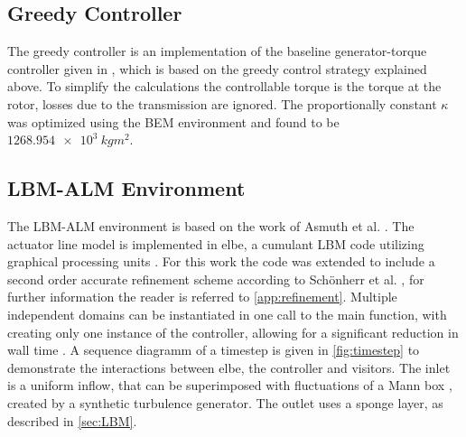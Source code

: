 \subsection{Greedy Controller}
The greedy controller is an implementation of the baseline generator-torque controller given in \cite{jonkman_definition_2009}, which is based on the greedy control strategy explained above. To simplify the calculations the controllable torque is the torque at the rotor, losses due to the transmission are ignored. The proportionally constant $\kappa$ was optimized using the BEM environment and found to be $\SI{1268.954e3}{kgm^2}$.
\subsection{LBM-ALM Environment}
The LBM-ALM environment is based on the work of Asmuth et al. \cite{asmuth_actuator_2020, asmuth_actuator_2019}. The actuator line model is implemented in elbe, a cumulant LBM code  utilizing graphical processing units \cite{jansen_validation_2015, gehrke_scrutinizing_2017}. For this work the code was extended to include a second order accurate refinement scheme according to Schönherr et al. \cite{schonherr_towards_2015}, for further information the reader is referred to \autoref{app:refinement}. Multiple independent domains can be instantiated in one call to the main function, with creating only one instance of the controller, allowing for a significant reduction in wall time \cite{rabault_accelerating_2019-1}. A sequence diagramm of a timestep is given in \autoref{fig:timestep} to demonstrate the interactions between elbe, the controller and visitors. The inlet is a uniform inflow, that can be superimposed with fluctuations of a Mann box \cite{mann_wind_1998}, created by a synthetic turbulence generator. The outlet uses a sponge layer, as described in \autoref{sec:LBM}.
